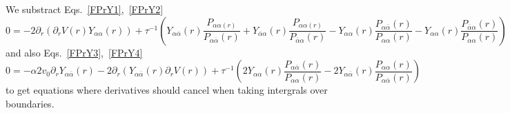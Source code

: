 \documentclass[pre,aps,superscriptaddress,nofootinbib]{revtex4}
\begin{document}
We substract Eqs.~\ref{FPrY1},~\ref{FPrY2}
\begin{equation}
0 = - 2 \partial_r (\partial_r V(r) Y_{\alpha\alpha}(r)) + \tau^{-1} \left(Y_{\alpha\overline{\alpha}}(r) \frac{P_{\alpha\alpha(r)}}{P_{\alpha\overline{\alpha}}(r)} + Y_{\overline{\alpha}\alpha}(r) \frac{P_{\alpha\alpha(r)}}{P_{\overline{\alpha}\alpha}(r)} - Y_{\alpha\alpha}(r) \frac{P_{\alpha\overline{\alpha}}(r)}{P_{\alpha\alpha}(r)} - Y_{\alpha\alpha}(r) \frac{P_{\overline{\alpha}\alpha}(r)}{P_{\alpha\alpha}(r)}\right)
\end{equation}
and also Eqs.~\ref{FPrY3},~\ref{FPrY4}
\begin{equation}
0 = - \alpha 2 v_0 \partial_r Y_{\alpha\overline{\alpha}}(r) - 2 \partial_r (Y_{\alpha\overline{\alpha}}(r) \partial_r V(r)) + \tau^{-1} \left(2 Y_{\alpha\alpha}(r) \frac{P_{\alpha\overline{\alpha}}(r)}{P_{\alpha\alpha}(r)} - 2 Y_{\alpha\overline{\alpha}}(r) \frac{P_{\alpha\alpha}(r)}{P_{\alpha\overline{\alpha}}(r)}\right)
\end{equation}
to get equations where derivatives should cancel when taking intergrals over boundaries.



{\renewcommand{\bibname}{References}}
\end{document}
